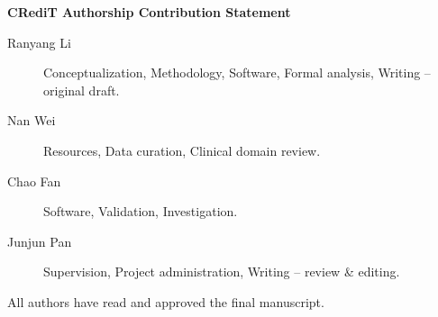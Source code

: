 \documentclass[11pt]{article}
\begin{document}
\begin{center}\textbf{CRediT Authorship Contribution Statement}\end{center}

\begin{description}
\item[Ranyang Li] Conceptualization, Methodology, Software, Formal analysis, Writing -- original draft.
\item[Nan Wei] Resources, Data curation, Clinical domain review.
\item[Chao Fan] Software, Validation, Investigation.
\item[Junjun Pan] Supervision, Project administration, Writing -- review \& editing.
\end{description}

All authors have read and approved the final manuscript.
\end{document}
